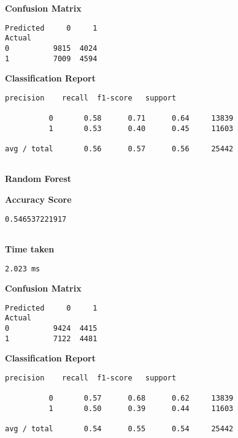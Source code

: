 \documentclass[11pt]{article}
\begin{document}
    \textbf{Confusion Matrix}

    
    \begin{Verbatim}[commandchars=\\\{\}]
Predicted     0     1
Actual               
0          9815  4024
1          7009  4594

    \end{Verbatim}

    \textbf{Classification Report}

    
    \begin{Verbatim}[commandchars=\\\{\}]
             precision    recall  f1-score   support

          0       0.58      0.71      0.64     13839
          1       0.53      0.40      0.45     11603

avg / total       0.56      0.57      0.56     25442


    \end{Verbatim}

    \textbf{Random Forest}

    
    \textbf{Accuracy Score}

    
    \begin{Verbatim}[commandchars=\\\{\}]
0.546537221917


    \end{Verbatim}

    \textbf{Time taken}

    
    \begin{Verbatim}[commandchars=\\\{\}]
2.023 ms

    \end{Verbatim}

    \textbf{Confusion Matrix}

    
    \begin{Verbatim}[commandchars=\\\{\}]
Predicted     0     1
Actual               
0          9424  4415
1          7122  4481

    \end{Verbatim}

    \textbf{Classification Report}

    
    \begin{Verbatim}[commandchars=\\\{\}]
             precision    recall  f1-score   support

          0       0.57      0.68      0.62     13839
          1       0.50      0.39      0.44     11603

avg / total       0.54      0.55      0.54     25442


    \end{Verbatim}
\end{document}
